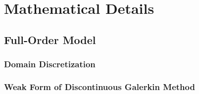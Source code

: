 \appendix

\section{Mathematical Details}\label{app_implementation}

\subsection{Full-Order Model}

\subsubsection{Domain Discretization}

\subsubsection{Weak Form of Discontinuous Galerkin Method}

